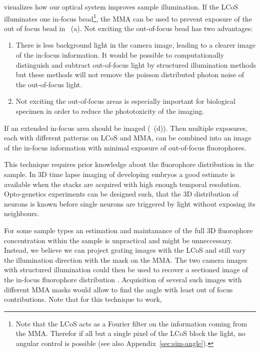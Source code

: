  visualizes how our optical system improves
sample illumination. If the LCoS illuminates one in-focus
bead\footnote{Note that the LCoS acts as a Fourier filter on the
  information coming from the MMA. Therefor if all but a single pixel
  of the LCoS block the light, no angular control is possible (see
  also Appendix~\ref{sec:sim-angle}).}, the MMA can be used to prevent
exposure of the out of focus bead in
~(a). Not exciting the out-of-focus bead has
two advantages:
\begin{enumerate}
\item There is less background light in the camera image, leading to a
  clearer image of the in-focus information. It would be possible to
  computationally distinguish and subtract out-of-focus light by
  structured illumination methods but these methods will not remove
  the poisson distributed photon noise of the out-of-focus light.
\item Not exciting the out-of-focus areas is especially important for
  biological specimen in order to reduce the phototoxicity of the
  imaging.
\end{enumerate}
If an extended in-focus area should be imaged
(~(d)). Then multiple exposures, each with
different patterns on LCoS and MMA, can be combined into an image of
the in-focus information with minimal exposure of out-of-focus
fluorophores.

This technique requires prior knowledge about the fluorophore
distribution in the sample. In 3D time lapse imaging of developing
embryos a good estimate is available when the stacks are acquired with
high enough temporal resolution. Opto-genetics experiments can be
designed such, that the 3D distribution of neurons is known before
single neurons are triggered by light without exposing its neighbours.

For some sample types an estimation and maintanance of the full 3D
fluorophore concentration within the sample is unpractical and might
be unneccessary. Instead, we believe we can project grating images
with the LCoS and still vary the illumination direction with the mask
on the MMA. The two camera images with structured illumination could
then be used to recover a sectioned image of the in-focus fluorophore
distribution \citep{2008Lim,Bozinovic2008,2009Santos}. Acquisition of several
such images with different MMA masks would allow to find the angle
with least out of focus contributions. Note that for this technique to
work,

